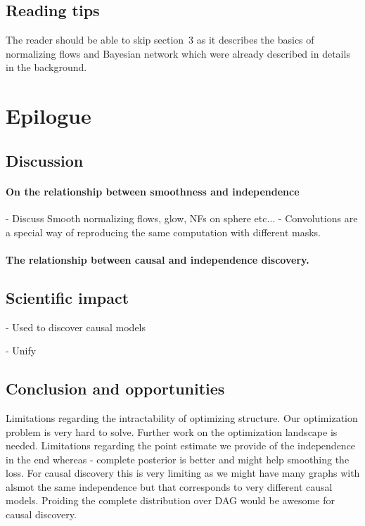 \subsection{Reading tips}
The reader should be able to skip section~3 as it describes the basics of normalizing flows and Bayesian network which were already described in details in the background.



\section{Epilogue}
\subsection{Discussion}

\paragraph{On the relationship between smoothness and independence}
- Discuss Smooth normalizing flows, glow, NFs on sphere etc...
- Convolutions are a special way of reproducing the same computation with different masks.

\paragraph{The relationship between causal and independence discovery.}

\subsection{Scientific impact}

- Used to discover causal models

- Unify

\subsection{Conclusion and opportunities}

Limitations regarding the intractability of optimizing structure. Our optimization problem is very hard to solve. Further work on the optimization landscape is needed. Limitations regarding the point estimate we provide of the independence in the end whereas - complete posterior is better and might help smoothing the loss. For causal discovery this is very limiting as we might have many graphs with alsmot the same independence but that corresponds to very different causal models. Proiding the complete distribution over DAG would be awesome for causal discovery.

